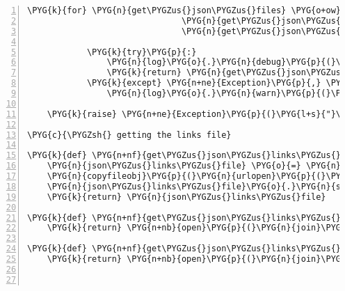 \begin{Verbatim}[commandchars=\\\{\},numbers=left,firstnumber=1,stepnumber=5]
        \PYG{k}{for} \PYG{n}{get\PYGZus{}json\PYGZus{}files} \PYG{o+ow}{in} \PYG{p}{(}\PYG{n}{get\PYGZus{}get\PYGZus{}json\PYGZus{}files\PYGZus{}web}\PYG{p}{(}\PYG{n}{json\PYGZus{}links\PYGZus{}file}\PYG{p}{)}\PYG{p}{,}
                               \PYG{n}{get\PYGZus{}json\PYGZus{}files\PYGZus{}cache}\PYG{p}{,}
                               \PYG{n}{get\PYGZus{}json\PYGZus{}files\PYGZus{}default}\PYG{p}{,}\PYG{p}{)}\PYG{p}{:}

            \PYG{k}{try}\PYG{p}{:}
                \PYG{n}{log}\PYG{o}{.}\PYG{n}{debug}\PYG{p}{(}\PYG{l+s}{"}\PYG{l+s}{trying }\PYG{l+s+si}{\PYGZpc{}s}\PYG{l+s}{"} \PYG{o}{\PYGZpc{}} \PYG{n}{get\PYGZus{}json\PYGZus{}files}\PYG{o}{.}\PYG{n}{func\PYGZus{}name}\PYG{p}{)}
                \PYG{k}{return} \PYG{n}{get\PYGZus{}json\PYGZus{}files}\PYG{p}{(}\PYG{p}{)}
            \PYG{k}{except} \PYG{n+ne}{Exception}\PYG{p}{,} \PYG{n}{e}\PYG{p}{:}
                \PYG{n}{log}\PYG{o}{.}\PYG{n}{warn}\PYG{p}{(}\PYG{l+s}{"}\PYG{l+s+si}{\PYGZpc{}s}\PYG{l+s}{ failed: }\PYG{l+s+si}{\PYGZpc{}r}\PYG{l+s}{"} \PYG{o}{\PYGZpc{}} \PYG{p}{(}\PYG{n}{get\PYGZus{}json\PYGZus{}files}\PYG{o}{.}\PYG{n}{func\PYGZus{}name}\PYG{p}{,} \PYG{n}{e}\PYG{p}{)}\PYG{p}{)}
    
    \PYG{k}{raise} \PYG{n+ne}{Exception}\PYG{p}{(}\PYG{l+s}{"}\PYG{l+s}{Couldn}\PYG{l+s}{'}\PYG{l+s}{t get json organism lists}\PYG{l+s}{"}\PYG{p}{)}

\PYG{c}{\PYGZsh{} getting the links file}

\PYG{k}{def} \PYG{n+nf}{get\PYGZus{}json\PYGZus{}links\PYGZus{}file\PYGZus{}web}\PYG{p}{(}\PYG{p}{)}\PYG{p}{:}
    \PYG{n}{json\PYGZus{}links\PYGZus{}file} \PYG{o}{=} \PYG{n}{StringIO}\PYG{p}{(}\PYG{p}{)}
    \PYG{n}{copyfileobj}\PYG{p}{(}\PYG{n}{urlopen}\PYG{p}{(}\PYG{n}{org\PYGZus{}list\PYGZus{}base\PYGZus{}url}\PYG{p}{)}\PYG{p}{,} \PYG{n}{json\PYGZus{}links\PYGZus{}file}\PYG{p}{)}
    \PYG{n}{json\PYGZus{}links\PYGZus{}file}\PYG{o}{.}\PYG{n}{seek}\PYG{p}{(}\PYG{l+m+mi}{0}\PYG{p}{)}
    \PYG{k}{return} \PYG{n}{json\PYGZus{}links\PYGZus{}file}

\PYG{k}{def} \PYG{n+nf}{get\PYGZus{}json\PYGZus{}links\PYGZus{}file\PYGZus{}cache}\PYG{p}{(}\PYG{p}{)}\PYG{p}{:}
    \PYG{k}{return} \PYG{n+nb}{open}\PYG{p}{(}\PYG{n}{join}\PYG{p}{(}\PYG{n}{org\PYGZus{}list\PYGZus{}cache\PYGZus{}dir}\PYG{p}{,} \PYG{n}{json\PYGZus{}links\PYGZus{}file\PYGZus{}name}\PYG{p}{)}\PYG{p}{)}

\PYG{k}{def} \PYG{n+nf}{get\PYGZus{}json\PYGZus{}links\PYGZus{}file\PYGZus{}default}\PYG{p}{(}\PYG{p}{)}\PYG{p}{:}
    \PYG{k}{return} \PYG{n+nb}{open}\PYG{p}{(}\PYG{n}{join}\PYG{p}{(}\PYG{n}{org\PYGZus{}list\PYGZus{}default\PYGZus{}dir}\PYG{p}{,} \PYG{n}{json\PYGZus{}links\PYGZus{}file\PYGZus{}name}\PYG{p}{)}\PYG{p}{)}



\end{Verbatim}
